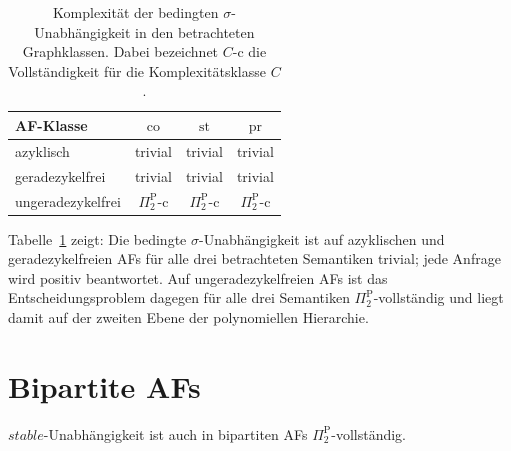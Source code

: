 \begin{table}[H]
    \myfloatalign
    \small
    \renewcommand{\arraystretch}{1.15}
    \begin{tabular}{@{}lccc@{}}
        \toprule
        AF-Klasse
            & \(\mathrm{co}\)
            & \(\mathrm{st}\)
            & \(\mathrm{pr}\) \\
        \midrule
        azyklisch
            & trivial & trivial & trivial \\
        geradezykelfrei
            & trivial & trivial & trivial \\
        ungeradezykelfrei
            & \(\Pi_2^{\mathrm{P}}\)-c
            & \(\Pi_2^{\mathrm{P}}\)-c
            & \(\Pi_2^{\mathrm{P}}\)-c \\
        \bottomrule
    \end{tabular}
    \caption[Komplexität der bedingten Unabhängigkeit in ausgewählten Graphklassen]{
        Komplexität der bedingten \(\sigma\)-Unabhängigkeit in den
        betrachteten Graphklassen. Dabei bezeichnet \(C\)-c die
        Vollständigkeit für die Komplexitätsklasse \(C\).
    }
    \label{tab:komplexitaet-graphklassen}
\end{table}

Tabelle~\ref{tab:komplexitaet-graphklassen} zeigt: Die bedingte
\(\sigma\)-Unabhängigkeit ist auf azyklischen und geradezykelfreien AFs
für alle drei betrachteten Semantiken trivial; jede Anfrage wird positiv
beantwortet. Auf ungeradezykelfreien AFs ist das Entscheidungsproblem
dagegen für alle drei Semantiken \(\Pi_2^{\mathrm{P}}\)-vollständig und liegt
damit auf der zweiten Ebene der polynomiellen Hierarchie.





\iffalse
\section{Bipartite AFs}
\begin{Proposition}
\label{prop:bip-st-ind-hard}
    \(stable\)-Unabhängigkeit ist auch in bipartiten AFs \(\Pi_2^{\mathrm{P}}\)-vollständig.
\end{Proposition}

